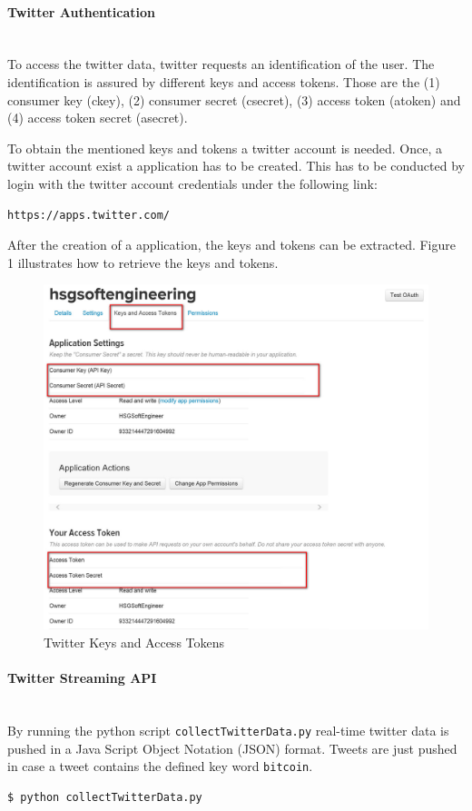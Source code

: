\documentclass[a4paper,12pt]{article}
\begin{document}
\begin{spacing}{1.2}
\paragraph{Twitter Authentication}\mbox{}\\{}
To access the twitter data, twitter requests an identification of the user. The identification is assured by different keys and access tokens. Those are the (1) consumer key (ckey), (2) consumer secret (csecret), (3) access token (atoken) and (4) access token secret (asecret).

To obtain the mentioned keys and tokens a twitter account is needed. Once, a twitter account exist a application has to be created. This has to be conducted by login with the twitter account credentials under the following link: 
\begin{lstlisting}[language=bash]
https://apps.twitter.com/
\end{lstlisting}

After the creation of a application, the keys and tokens can be extracted. Figure 1 illustrates how to retrieve the keys and tokens.
\begin{figure}[h]
\centering
\includegraphics[scale=0.6]{twitteraccess}
\caption{Twitter Keys and Access Tokens}
\end{figure}

\paragraph{Twitter Streaming API}\mbox{}\\{}
By running the python script \verb|collectTwitterData.py| real-time twitter data is pushed in a Java Script Object Notation (JSON) format. Tweets are just pushed in case a tweet contains the defined key word \verb|bitcoin|.
\begin{lstlisting}[language=bash]
$ python collectTwitterData.py
\end{lstlisting}


\end{spacing}
\end{document}
